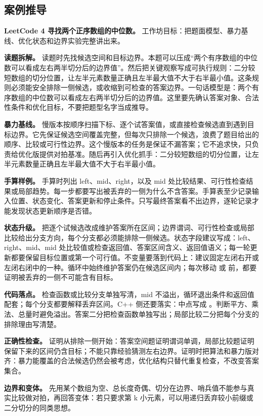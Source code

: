 \subsection{案例推导}

\noindent\textbf{LeetCode 4 寻找两个正序数组的中位数。} 工作坊目标：把题面模型、暴力基线、优化状态和边界实验完整讲出来。

\textbf{读题拆解。} 读题时先找候选空间和目标边界。本题可以压成“两个有序数组的中位数可以看成左右两半切分后的边界值”。然后把关键观察写成可执行规则：二分较短数组的切分位置，让左半元素数量正确且左半最大值不大于右半最小值。这条规则必须能安全排除一侧候选，或收缩到可检查的答案边界。一句话模型是：两个有序数组的中位数可以看成左右两半切分后的边界值。这里要先确认答案对象、合法性条件和优化目标，不要把题型名字当成推导。

\textbf{暴力基线。} 慢版本按顺序扫描下标、逐个试答案值，或直接检查候选直到遇到目标边界。它先保证候选空间覆盖完整，但每次只排除一个候选，浪费了题目给出的顺序、比较或可行性边界。这个慢版本的任务是保证不漏答案；它不追求快，只负责给优化版提供对拍基准。随后再引入优化抓手：二分较短数组的切分位置，让左半元素数量正确且左半最大值不大于右半最小值。

\textbf{手算样例。} 手算时列出 left、mid、right，以及 mid 处比较结果、可行性检查结果或局部趋势。每一步都要写出被丢弃的一侧为什么不含答案。手算表至少记录输入位置、状态变化、答案更新和停止条件。只写最终答案看不出边界，逐轮记录才能发现状态更新顺序是否错。

\textbf{状态升级。} 把逐个试候选改成维护答案所在区间；边界谓词、可行性检查或局部比较给出分支方向，每个分支都必须能排除一侧候选。状态字段建议写成：left、right、mid、mid 处比较值或检查返回值、答案区间含义、返回值语义；每一轮更新都要保留目标位置或第一个可行值。不变量要落到代码上：建议固定左闭右开或左闭右闭中的一种。循环中始终维护答案仍在候选区间内；每次移动  或  前，都要证明被丢弃的一侧不可能含有目标。

\textbf{代码落点。} 检查函数或比较分支单独写清，mid 不溢出，循环退出条件和返回值配套；每个分支都要解释丢弃区间。C++ 侧还要落实：中点写成 。判断平方、乘法、总量时避免溢出。答案二分把检查函数单独写出；局部比较二分把每个分支的排除理由写清楚。

\textbf{正确性检查。} 证明从排除一侧开始：答案空间题证明谓词单调，局部比较题证明保留下来的区间仍含目标；不能只靠经验猜测左右边界。证明时把算法和暴力版对齐：暴力能覆盖的合法候选仍然会被考虑，优化结构只替代重复检查，不改变答案集合。

\textbf{边界和变体。} 先用某个数组为空、总长度奇偶、切分在边界、哨兵值不能参与真实比较做对拍，再回答变体：若只要求第 k 小元素，可以用递归丢弃较小前缀或二分切分的同类思想。


